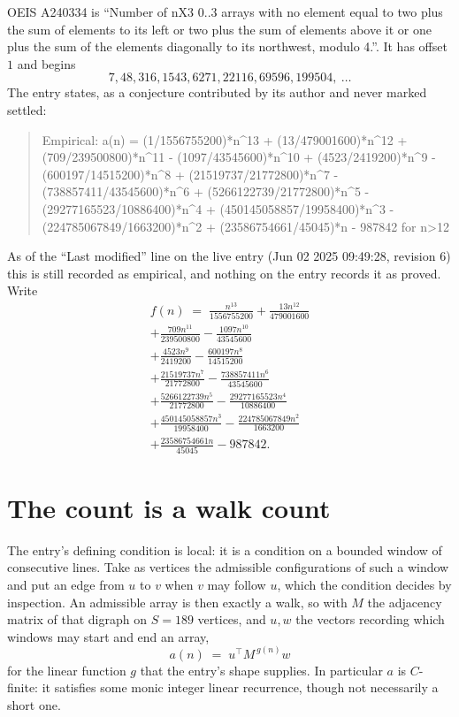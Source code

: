 \documentclass[11pt,a4paper]{article}
\theoremstyle{plain}
\theoremstyle{definition}
\begin{document}
OEIS A240334 is ``Number of nX3 0..3 arrays with no element equal to two plus the sum of elements to its left or two plus the sum of elements above it or one plus the sum of the elements diagonally to its northwest, modulo 4.''. It has offset $1$ and begins
\[
7, 48, 316, 1543, 6271, 22116, 69596, 199504,\ \dots
\]
The entry states, as a conjecture contributed by its author and never marked settled:
\begin{quote}
Empirical: a(n) = (1/1556755200)*n\^{}13 + (13/479001600)*n\^{}12 + (709/239500800)*n\^{}11 - (1097/43545600)*n\^{}10 + (4523/2419200)*n\^{}9 - (600197/14515200)*n\^{}8 + (21519737/21772800)*n\^{}7 - (738857411/43545600)*n\^{}6 + (5266122739/21772800)*n\^{}5 - (29277165523/10886400)*n\^{}4 + (450145058857/19958400)*n\^{}3 - (224785067849/1663200)*n\^{}2 + (23586754661/45045)*n - 987842 for n>12
\end{quote}
As of the ``Last modified'' line on the live entry (Jun 02 2025 09:49:28, revision 6) this is still
recorded as empirical, and nothing on the entry records it as proved. Write
\begin{multline*}
f(n)\;=\;\frac{n^{13}}{1556755200} + \frac{13 n^{12}}{479001600} \\
+ \frac{709 n^{11}}{239500800} - \frac{1097 n^{10}}{43545600} \\
+ \frac{4523 n^{9}}{2419200} - \frac{600197 n^{8}}{14515200} \\
+ \frac{21519737 n^{7}}{21772800} - \frac{738857411 n^{6}}{43545600} \\
+ \frac{5266122739 n^{5}}{21772800} - \frac{29277165523 n^{4}}{10886400} \\
+ \frac{450145058857 n^{3}}{19958400} - \frac{224785067849 n^{2}}{1663200} \\
+ \frac{23586754661 n}{45045} - 987842.
\end{multline*}

\section{The count is a walk count}

The entry's defining condition is local: it is a condition on a bounded window of consecutive lines. Take as vertices the
admissible configurations of such a window and put an edge from $u$ to $v$ when $v$ may
follow $u$, which the condition decides by inspection. An admissible array is then exactly a
walk, so with $M$ the adjacency matrix of that digraph on $S=189$ vertices, and $u,w$ the
vectors recording which windows may start and end an array,
\[
a(n)\;=\;u^{\!\top}M^{\,g(n)}w
\]
for the linear function $g$ that the entry's shape supplies. In particular $a$ is
$C$-finite: it satisfies some monic integer linear recurrence, though not necessarily a short
one.
\end{document}
